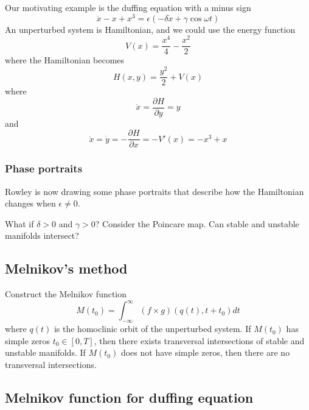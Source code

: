 \documentclass{article}
\begin{document}
Our motivating example is the duffing equation with a minus sign 
\[
\ddot{x} - x + x^3 = \epsilon\left(-\delta \dot{x} + \gamma \cos \omega t \right)
\]
An unperturbed system is Hamiltonian, and we could use the energy function 
\[
V(x) = \frac{x^4}{4}-\frac{x^2}{2}
\]
where the Hamiltonian becomes 
\[
H(x,y) = \frac{y^2}{2} + V(x)
\]
where 
\[
\dot{x} = \frac{\partial H}{\partial y}=y
\]
and 
\[
\ddot{x} = \dot{y} = -\frac{\partial H}{\partial x}=-V'(x) = -x^3 + x
\]

\subsubsection{Phase portraits}

Rowley is now drawing some phase portraits that describe how the Hamiltonian changes when $\epsilon\neq 0$. 

What if $\delta>0$ and $\gamma >0$? Consider the Poincare map. Can stable and unstable manifolds intersect?

\subsection{Melnikov's method}

Construct the Melnikov function 
\[
M\left(t_0\right) = \int_{-\infty}^{\infty} \left(f\times g\right)\left(q(t),t+t_0\right)dt
\]
where $q(t)$ is the homoclinic orbit of the unperturbed system. If $M(t_0)$ has simple zeros $t_0\in \left[0,T\right]$, then there exists transversal intersections of stable and unstable manifolds. If $M(t_0)$ does not have simple zeros, then there are no transversal intersections.

\subsection{Melnikov function for duffing equation}
\end{document}
